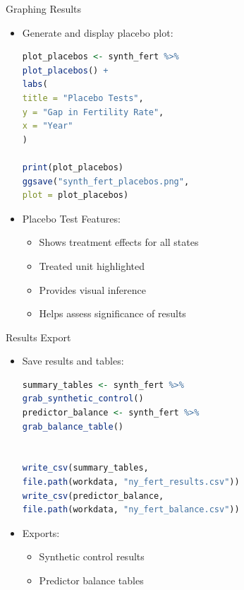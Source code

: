 \documentclass[hyperref={pdfpagelabels=false}]{beamer}
\begin{document}
\begin{frame}[fragile]{Graphing Results}
\begin{itemize}
\item Generate and display placebo plot:
\vspace{0.2cm}
\begin{lstlisting}[language=R, style=r-style]
plot_placebos <- synth_fert %>%
plot_placebos() +
labs(
title = "Placebo Tests",
y = "Gap in Fertility Rate",
x = "Year"
)

print(plot_placebos)
ggsave("synth_fert_placebos.png", 
plot = plot_placebos)
\end{lstlisting}
\item Placebo Test Features:
\begin{itemize}
	\item Shows treatment effects for all states
	\item Treated unit highlighted
	\item Provides visual inference
	\item Helps assess significance of results
\end{itemize}
\end{itemize}
\end{frame}

\begin{frame}[fragile]{Results Export}
\begin{itemize}
\item Save results and tables:
\vspace{0.2cm}
\begin{lstlisting}[language=R, style=r-style]
summary_tables <- synth_fert %>%
grab_synthetic_control()
predictor_balance <- synth_fert %>%
grab_balance_table()


write_csv(summary_tables, 
file.path(workdata, "ny_fert_results.csv"))
write_csv(predictor_balance, 
file.path(workdata, "ny_fert_balance.csv"))
\end{lstlisting}
\item Exports:
\begin{itemize}
\item Synthetic control results
\item Predictor balance tables
\end{itemize}
\end{itemize}
\end{frame}
\end{document}

